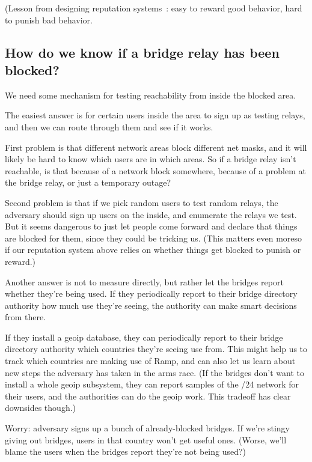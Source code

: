 \documentclass{llncs}
\begin{document}
(Lesson from designing reputation systems~\cite{rep-anon}: easy to
reward good behavior, hard to punish bad behavior.

\subsection{How do we know if a bridge relay has been blocked?}

We need some mechanism for testing reachability from inside the
blocked area.

The easiest answer is for certain users inside the area to sign up as
testing relays, and then we can route through them and see if it works.

First problem is that different network areas block different net masks,
and it will likely be hard to know which users are in which areas. So
if a bridge relay isn't reachable, is that because of a network block
somewhere, because of a problem at the bridge relay, or just a temporary
outage?

Second problem is that if we pick random users to test random relays, the
adversary should sign up users on the inside, and enumerate the relays
we test. But it seems dangerous to just let people come forward and
declare that things are blocked for them, since they could be tricking
us. (This matters even moreso if our reputation system above relies on
whether things get blocked to punish or reward.)

Another answer is not to measure directly, but rather let the bridges
report whether they're being used. If they periodically report to their
bridge directory authority how much use they're seeing, the authority
can make smart decisions from there.

If they install a geoip database, they can periodically report to their
bridge directory authority which countries they're seeing use from. This
might help us to track which countries are making use of Ramp, and can
also let us learn about new steps the adversary has taken in the arms
race. (If the bridges don't want to install a whole geoip subsystem, they
can report samples of the /24 network for their users, and the authorities
can do the geoip work. This tradeoff has clear downsides though.)

Worry: adversary signs up a bunch of already-blocked bridges. If we're
stingy giving out bridges, users in that country won't get useful ones.
(Worse, we'll blame the users when the bridges report they're not
being used?)
\end{document}
